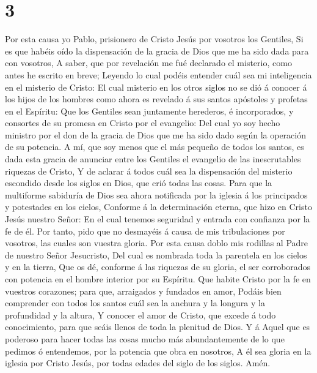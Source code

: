 \hypertarget{section-2}{%
\section{3}\label{section-2}}

 Por esta causa yo Pablo, prisionero de Cristo Jesús por
vosotros los Gentiles,  Si es que habéis oído la
dispensación de la gracia de Dios que me ha sido dada para con vosotros,
 A saber, que por revelación me fué declarado el misterio,
como antes he escrito en breve;  Leyendo lo cual podéis
entender cuál sea mi inteligencia en el misterio de Cristo:
 El cual misterio en los otros siglos no se dió á conocer
á los hijos de los hombres como ahora es revelado á sus santos apóstoles
y profetas en el Espíritu:  Que los Gentiles sean
juntamente herederos, é incorporados, y consortes de su promesa en
Cristo por el evangelio:  Del cual yo soy hecho ministro
por el don de la gracia de Dios que me ha sido dado según la operación
de su potencia.  A mí, que soy menos que el más pequeño de
todos los santos, es dada esta gracia de anunciar entre los Gentiles el
evangelio de las inescrutables riquezas de Cristo,  Y de
aclarar á todos cuál sea la dispensación del misterio escondido desde
los siglos en Dios, que crió todas las cosas.  Para que
la multiforme sabiduría de Dios sea ahora notificada por la iglesia á
los principados y potestades en los cielos,  Conforme á
la determinación eterna, que hizo en Cristo Jesús nuestro Señor:
 En el cual tenemos seguridad y entrada con confianza por
la fe de él.  Por tanto, pido que no desmayéis á causa de
mis tribulaciones por vosotros, las cuales son vuestra gloria.
 Por esta causa doblo mis rodillas al Padre de nuestro
Señor Jesucristo,  Del cual es nombrada toda la parentela
en los cielos y en la tierra,  Que os dé, conforme á las
riquezas de su gloria, el ser corroborados con potencia en el hombre
interior por su Espíritu.  Que habite Cristo por la fe en
vuestros corazones; para que, arraigados y fundados en amor,
 Podáis bien comprender con todos los santos cuál sea la
anchura y la longura y la profundidad y la altura,  Y
conocer el amor de Cristo, que excede á todo conocimiento, para que
seáis llenos de toda la plenitud de Dios.  Y á Aquel que
es poderoso para hacer todas las cosas mucho más abundantemente de lo
que pedimos ó entendemos, por la potencia que obra en nosotros,
 A él sea gloria en la iglesia por Cristo Jesús, por
todas edades del siglo de los siglos. Amén.

